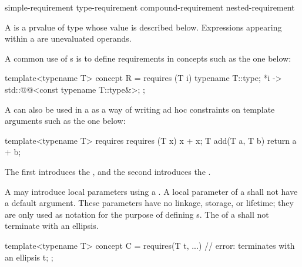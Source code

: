\begin{bnf}
\br
    simple-requirement\br
    type-requirement\br
    compound-requirement\br
    nested-requirement
\end{bnf}

\pnum
A  is a prvalue of type 
whose value is described below.
Expressions appearing within a 
are unevaluated operands.

\pnum
\begin{example}
A common use of s is to define
requirements in concepts such as the one below:
\begin{codeblock}
template<typename T>
  concept R = requires (T i) {
    typename T::type;
    {*i} -> std::@@<const typename T::type&>;
  };
\end{codeblock}
A  can also be used in a
 as a way of writing ad hoc
constraints on template arguments such as the one below:
\begin{codeblock}
template<typename T>
  requires requires (T x) { x + x; }
    T add(T a, T b) { return a + b; }
\end{codeblock}
The first  introduces the
, and the second
introduces the .
\end{example}

\pnum
A  may introduce local parameters using a
.
A local parameter of a  shall not have a
default argument.
These parameters have no linkage, storage, or lifetime; they are only used
as notation for the purpose of defining s.
The  of a
shall not terminate with an ellipsis.
\begin{example}
\begin{codeblock}
template<typename T>
concept C = requires(T t, ...) {    // error: terminates with an ellipsis
  t;
};
\end{codeblock}
\end{example}

